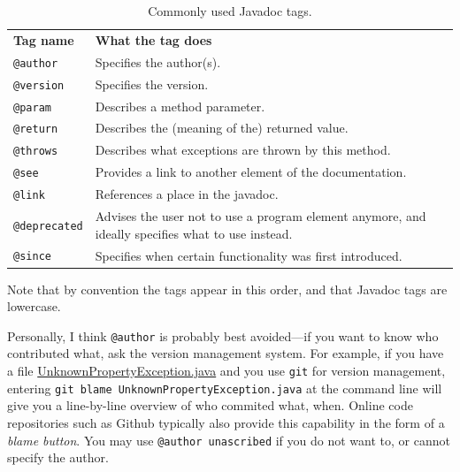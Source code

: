 \documentclass[12pt, a4paper, twoside,openany,titlepage]{article}
\begin{document}
\begin{table}[!ht]
\vspace{1em}
\caption{Commonly used Javadoc tags.\label{tab:javadoc-tags}}
\begin{tabular}{lp{10cm}}
\vspace{0.5em}
\textbf{Tag name}    & \textbf{What the tag does}                                 \\
\texttt{@author}     & Specifies the author(s).                                   \\
\texttt{@version}    & Specifies the version.                                     \\
\texttt{@param}      & Describes a method parameter.                              \\
\texttt{@return}     & Describes the (meaning of the) returned value.             \\
\texttt{@throws}     & Describes what exceptions are thrown by this method.       \\
\texttt{@see}        & Provides a link to another element of the documentation.   \\
\texttt{@link}       & References a place in the javadoc.                         \\
\texttt{@deprecated} & Advises the user not to use a program element anymore, and ideally specifies what to use instead.     \\
\texttt{@since}      & Specifies when certain functionality was first introduced. \\
\end{tabular}
\end{table}

Note that by convention the tags appear in this order, and that Javadoc tags are lowercase.

Personally, I think \texttt{@author} is probably best avoided---if you want to know who contributed what, ask the version management system. For example, if you have a file \url{UnknownPropertyException.java} and you use \texttt{git} for version management, entering \texttt{git blame UnknownPropertyException.java} at the command line will give you a line-by-line overview of who commited what, when. Online code repositories such as Github typically also provide this capability in the form of a \textit{blame button}.
You may use \texttt{@author unascribed} if you do not want to, or cannot specify the author.
\end{document}
